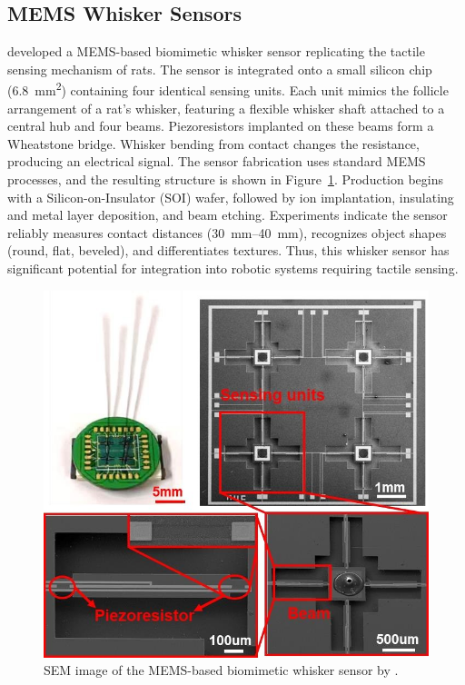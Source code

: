 \subsection{MEMS Whisker Sensors}
\textcite{9114501} developed a MEMS-based biomimetic whisker sensor replicating the tactile sensing mechanism of rats.
The sensor is integrated onto a small silicon chip (\SI{6.8}{\milli\meter\squared}) containing four identical sensing units.
Each unit mimics the follicle arrangement of a rat's whisker, featuring a flexible whisker shaft attached to a central hub and four beams.
Piezoresistors implanted on these beams form a Wheatstone bridge.
Whisker bending from contact changes the resistance, producing an electrical signal.
The sensor fabrication uses standard MEMS processes, and the resulting structure is shown in Figure~\ref{fig:mems-whisker}.
Production begins with a Silicon-on-Insulator (SOI) wafer, followed by ion implantation, insulating and metal layer deposition, and beam etching.
Experiments indicate the sensor reliably measures contact distances (\qtyrange{30}{40}{\milli\metre}), recognizes object shapes (round, flat, beveled), and differentiates textures.
Thus, this whisker sensor has significant potential for integration into robotic systems requiring tactile sensing.

\begin{figure}[htb]
    \centering
    \includegraphics[height=0.4\textheight]{figures/mems-whisker}
    \caption{SEM image of the MEMS-based biomimetic whisker sensor by \textcite{9114501}.}
    \label{fig:mems-whisker}
\end{figure}

